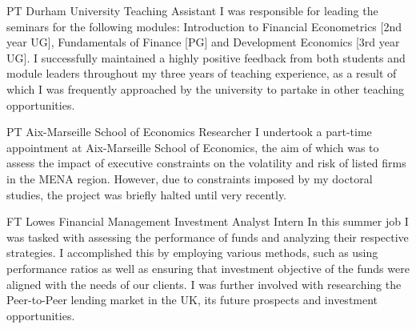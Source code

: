 \documentclass[10pt]{article} %
\begin{document}
\begin{paracol}{2}






{PT} %
{Durham University} %
{Teaching Assistant } %
{I was responsible for leading the seminars for the following modules:
Introduction to Financial Econometrics [2nd year UG],
Fundamentals of Finance [PG] and
Development Economics [3rd year UG]. I success\-fully main\-tained a highly
 positive feedback from both students and mo\-dule leaders throughout my three years of teaching experience, as a result of which I
 was frequently approached by the university to partake in other teaching opportunities.}  %


{PT} %
{Aix-Marseille School of Economics} %
{Researcher} %
{I undertook a part-time appointment at Aix-Marseille School of Eco\-nomics, the aim of which was to assess the impact of executive cons\-traints on the vola\-tility and risk of listed firms in the MENA region. However, due to constraints imposed by my doctoral studies, the project was briefly halted until very recently. }  %


{FT} %
{Lowes Financial Management} %
{Investment Analyst Intern} %
{In this summer job I was tasked with assessing the performance of funds and analyzing their respective strategies. I accomplished this by emplo\-ying various methods, such as using performance ratios as well as ensu\-ring that investment objective of the funds were aligned with the needs of our clients. I was further involved with resear\-ching the Peer-to-Peer lending market in the UK, its future prospects and investment oppor\-tunities.} %



\end{paracol}
\end{document}
